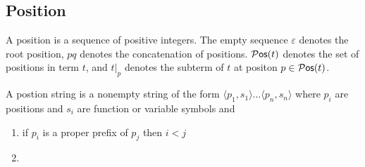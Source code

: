 \documentclass[ 
xcolor={usenames,dvipsnames,svgnames,tablem} 
,handout
]{beamer}
\begin{document}



\subsection{Position}
\begin{frame}
\begin{definition}
A position is a sequence of positive integers.
The empty sequence $\varepsilon$ denotes the root position,
$pq$ denotes the concatenation of positions. 
${}{\mathcal P}\mathsf{os}(t)$ denotes the set of positions in term $t$, and $t|_p$ denotes the subterm of $t$ at positon $p\in{}{\mathcal P}\mathsf{os}(t)$.
\end{definition}

\begin{definition}
A postion string is a nonempty string of the form $\langle p_1,s_1\rangle\ldots\langle p_n,s_n\rangle$
where $p_i$ are positions and $s_i$ are function or variable symbols and
\begin{enumerate}
\item
if $p_i$ is a proper prefix of $p_j$ then $i<j$
\item
\end{enumerate}
\end{definition}
\end{frame}
\end{document}

